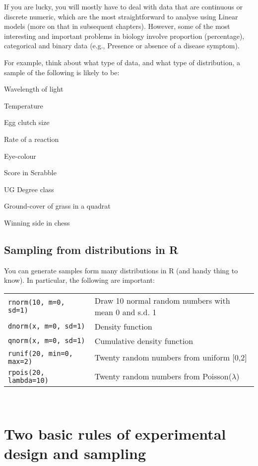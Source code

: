 If you are lucky, you will mostly have to deal with data that are 
continuous or discrete numeric, which are the most straightforward to 
analyse using Linear models (more on that in subsequent chapters). 
However, some of the most interesting and important problems in biology 
involve proportion (percentage), categorical and binary data (e.g., 
Presence or absence of a disease symptom). 

For example, think about what type of data, and what type of 
distribution, a sample of the following is likely to be:
\begin{compactitem}
    \item Wavelength of light
    \item Temperature
    \item Egg clutch size
    \item Rate of a reaction
    \item Eye-colour
    \item Score in Scrabble
    \item UG Degree class
    \item Ground-cover of grass in a quadrat
    \item Winning side in chess
\end{compactitem}

\subsection{Sampling from distributions in R}

You can generate samples form many distributions in R (and handy thing 
to know). In particular, the following are important: 
 
\begin{tabular}{p{5.4cm} p{9cm}}
    {\tt rnorm(10, m=0, sd=1)} & Draw 10 normal random numbers with mean 0 and s.d. 1\\
    {\tt dnorm(x, m=0, sd=1)} & Density function\\
    {\tt qnorm(x, m=0, sd=1)} & Cumulative density function\\
    {\tt runif(20, min=0, max=2)} & Twenty random numbers from uniform
        [0,2]\\
    {\tt rpois(20, lambda=10)} & Twenty random numbers from
        Poisson($\lambda$)\\
\end{tabular}\\

\section{Two basic rules of experimental design and sampling}

